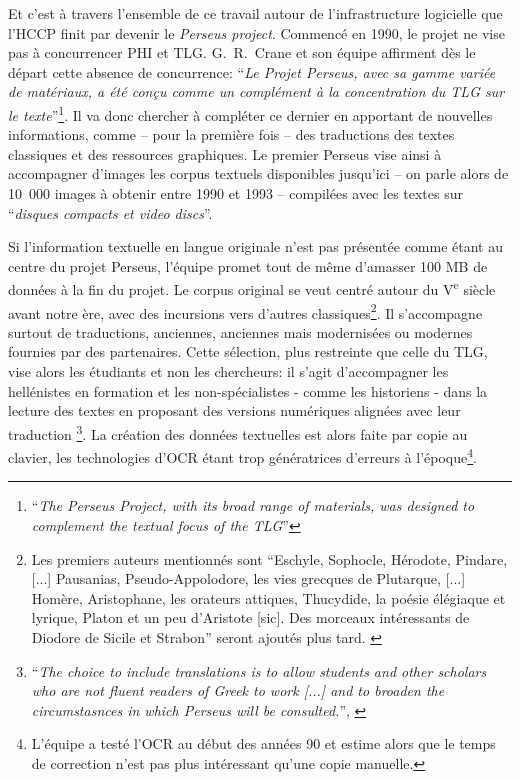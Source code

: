 Et c'est à travers l'ensemble de ce travail autour de l'infrastructure logicielle que l'HCCP finit par devenir le \textit{Perseus project}. Commencé en 1990, le projet ne vise pas à concurrencer PHI et TLG. G.~R.~Crane et son équipe affirment dès le départ cette absence de concurrence: \enquote{\textit{Le Projet Perseus, avec sa gamme variée de matériaux, a été conçu comme un complément à la concentration du TLG sur le texte}}\footnote{\enquote{\textit{The Perseus Project, with its broad range of materials, was designed to complement the textual focus of the TLG}}\textcite[p. 134]{mylonas_perseus_1993}}. Il va donc chercher à compléter ce dernier en apportant de nouvelles informations, comme -- pour la première fois -- des traductions des textes classiques et des ressources graphiques. Le premier Perseus vise ainsi à accompagner d'images les corpus textuels disponibles jusqu'ici -- on parle alors de 10~000 images à obtenir entre 1990 et 1993 -- compilées avec les textes sur \enquote{\textit{disques compacts et video discs}}.

Si l'information textuelle en langue originale n'est pas présentée comme étant au centre du projet Perseus, l'équipe promet tout de même d'amasser 100 MB de données à la fin du projet. Le corpus original se veut centré autour du V\textsuperscript{e} siècle avant notre ère, avec des incursions vers d'autres classiques\footnote{Les premiers auteurs mentionnés sont \enquote{Eschyle, Sophocle, Hérodote, Pindare, {[...]} Pausanias, Pseudo-Appolodore, les vies grecques de Plutarque, {[...]} Homère, Aristophane, les orateurs attiques, Thucydide, la poésie élégiaque et lyrique, Platon et un peu d'Aristote {[sic]}. Des morceaux intéressants de Diodore de Sicile et Strabon} seront ajoutés plus tard. \cite{mylonas_perseus_1993}}. Il s'accompagne surtout de traductions, anciennes, anciennes mais modernisées ou modernes fournies par des partenaires. Cette sélection, plus restreinte que celle du TLG, vise alors les étudiants et non les chercheurs: il s'agit d'accompagner les hellénistes en formation et les non-spécialistes - comme les historiens - dans la lecture des textes en proposant des versions numériques alignées avec leur traduction \footnote{\enquote{\textit{The choice to include translations is to allow students and other scholars who are not fluent readers of Greek to work {[...]} and to broaden the circumstasnces in which Perseus will be consulted.}}, \cite[p. 136]{mylonas_perseus_1993}}. La création des données textuelles est alors faite par copie au clavier, les technologies d'OCR étant trop génératrices d'erreurs à l'époque\footnote{L'équipe a testé l'OCR au début des années 90 et estime alors que le temps de correction n'est pas plus intéressant qu'une copie manuelle.}.

